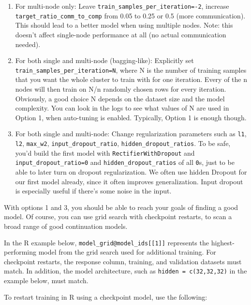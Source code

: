 {{\begin{enumerate}
\item For multi-node only: Leave \texttt{train\_samples\_per\_iteration=-2}, increase \texttt{target\_ratio\_comm\_to\_comp} from 0.05 to 0.25 or 0.5 (more communication). This should lead to a better model when using multiple nodes. Note: this doesn’t affect single-node performance at all (no actual communication needed).
\item For both single and multi-node (bagging-like): Explicitly set \\\texttt{train\_samples\_per\_iteration=N}, where N is the number of training samples that you want the whole cluster to train with for one iteration. Every of the n nodes will then train on N/n randomly chosen rows for every iteration. Obviously, a good choice N depends on the dataset size and the model complexity. You can look in the logs to see what values of N are used in Option 1, when auto-tuning is enabled. Typically, Option 1 is enough though.
\item For both single and multi-node: Change regularization parameters such as \texttt{l1}, \texttt{l2}, \texttt{max\_w2}, \texttt{input\_dropout\_ratio}, \texttt{hidden\_dropout\_ratios}. To be safe, you’d build the first model with \texttt{RectifierWithDropout} and \texttt{input\_dropout\_ratio=0} and \texttt{hidden\_dropout\_ratios} of all \texttt{0}s, just to be able to later turn on dropout regularization. We often use hidden Dropout for our first model already, since it often improves generalization. Input dropout is especially useful if there’s some noise in the input.
\end{enumerate}

With options 1 and 3, you should be able to reach your goals of finding a good model. Of course, you can use grid search with checkpoint restarts, to scan a broad range of good continuation models.

In the R example below, \texttt{model\_grid@model\_ids[[1]]} represents the highest-performing model from the grid search used for additional training. For checkpoint restarts, the response column, training, and validation datasets must match.  In addition, the model architecture, such as \texttt{hidden = c(32,32,32)} in the example below, must match.

\waterExampleInR
To restart training in R using a checkpoint model, use the following: 


}}
